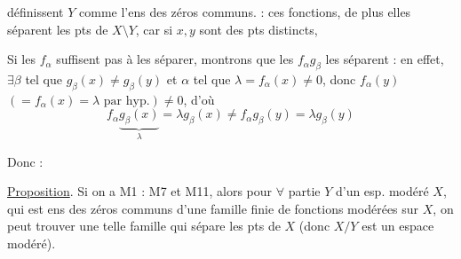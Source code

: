 
définissent $Y$ comme l'ens des zéros communs.  : ces fonctions, de plus elles séparent les pts de $X\setminus Y$, car si $x,y$ sont des pts distincts, 

Si les $f_\alpha$  suffisent pas à les séparer, montrons que les $f_\alpha g_\beta$ les séparent : en effet, $\exists\beta$ tel que $g_\beta(x)\ne g_\beta(y)$  et $\alpha$ tel que $\lambda=f_\alpha(x)\ne0$, donc $f_\alpha(y)$ $(=f_\alpha(x)=\lambda\text{ par hyp.})\ne0$, d'où
\[
f_\alpha\underbrace{g_\beta(x)}_{\lambda}=\lambda g_\beta(x)\ne f_\alpha g_\beta(y)=\lambda g_\beta(y)
\]

Donc :

\uline{Proposition}. Si on a M1 : M7 et M11, alors pour $\forall$ partie   $Y$ d'un esp. modéré $X$, qui est ens des zéros communs d'une famille finie de fonctions modérées sur $X$, on peut trouver une telle famille qui sépare les pts de $X$ (donc $X/Y$ est un espace modéré).


